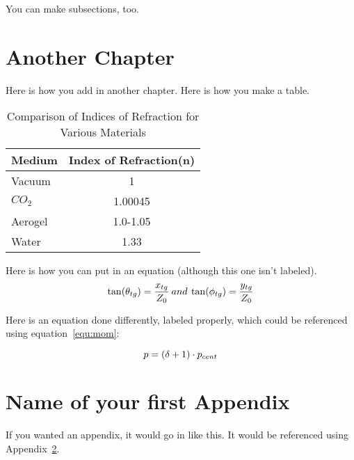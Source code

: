 \documentclass[12pt, oneside]{smuthesis}
\begin{document}
You can make subsections, too.

\newpage

\chapter{Another Chapter}

Here is how you add in another chapter.
Here is how you make a table. \\

\begin{table}
\caption{Comparison of Indices of Refraction for Various Materials}
\label{tab:refindex}
\centering
\begin{tabular}{l|c}
\hline \hline
Medium    & Index of Refraction(n) \\
\hline
Vacuum    & 1                     \\
$CO_{2}$  & 1.00045               \\
Aerogel   & 1.0-1.05              \\
Water     & 1.33                  \\
\hline \hline
\end{tabular}
\end{table}

Here is how you can put in an equation (although this one isn't labeled). \\

\begin{displaymath}
\centering
\tan(\theta_{tg}) = \frac{x_{tg}}{Z_{0}} \: and \:
\tan(\phi_{tg}) = \frac{y_{tg}}{Z_{0}}
\end{displaymath}

Here is an equation done differently, labeled properly, which could be 
referenced using equation~\ref{equ:mom}:

\begin{equation}
\centering
p = (\delta + 1)\cdot p_{cent}
\label{equ:mom}
\end{equation}


\appendix

\chapter{Name of your first Appendix}
\label{app:optics}

If you wanted an appendix, it would go in like this.  It would be 
referenced using Appendix~\ref{app:optics}.


\begin{singlespace}

\end{singlespace}
\end{document}
